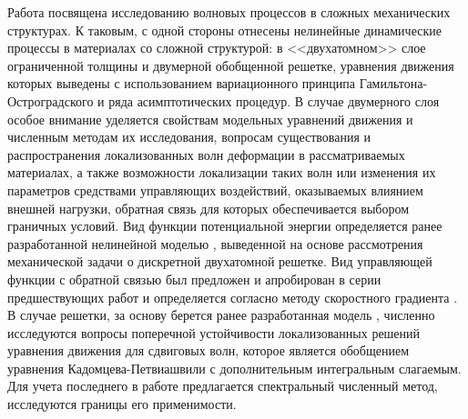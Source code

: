 

Работа посвящена исследованию волновых процессов в сложных механических структурах. К таковым, с одной стороны отнесены нелинейные динамические процессы в материалах со сложной структурой: в <<двухатомном>> слое ограниченной толщины и двумерной обобщенной решетке, уравнения движения которых выведены с использованием вариационного принципа Гамильтона-Остроградского и ряда асимптотических процедур. В случае двумерного слоя особое внимание уделяется свойствам модельных уравнений движения и численным методам их исследования, вопросам существования и распространения локализованных волн деформации в рассматриваемых материалах, а также возможности локализации таких волн или изменения их параметров средствами управляющих воздействий, оказываемых влиянием внешней нагрузки, обратная связь для которых обеспечивается выбором граничных условий. Вид функции потенциальной энергии определяется ранее разработанной нелинейной моделью \cite{bound_porsp17}, выведенной на основе рассмотрения механической задачи о дискретной двухатомной решетке. Вид управляющей функции с обратной связью был предложен и апробирован в серии предшествующих работ \cite{porant16,porant17,PorubovAntonov2018mechSystem} и определяется согласно методу скоростного градиента \cite{fradkov_rus_speed_grad}. В случае решетки, за основу берется ранее разработанная модель \cite{porkros}, численно исследуются вопросы поперечной устойчивости локализованных решений уравнения движения для сдвиговых волн, которое является обобщением уравнения Кадомцева-Петвиашвили \cite{kadpet} с дополнительным интегральным слагаемым. Для учета последнего в работе предлагается спектральный численный метод, исследуются границы его применимости.

